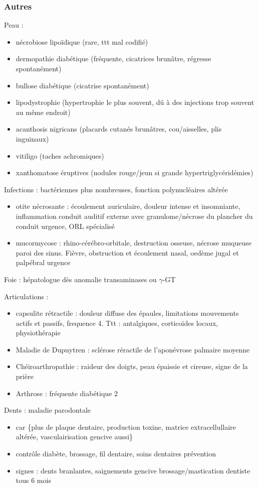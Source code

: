 \documentclass[11pt]{article}
\begin{document}
\subsubsection{Autres}
\label{sec:org185ba84}
Peau : 
\begin{itemize}
\item nécrobiose lipoïdique (rare, ttt mal codifié)
\item dermopathie diabétique (fréquente, cicatrices brunâtre, régresse spontanément)
\item bullose diabétique (cicatrise spontanément)
\item lipodystrophie (hypertrophie le plus souvent, dû à des injections trop souvent
au même endroit)
\item acanthosis nigricans (placards cutanés brunâtres, cou/aisselles, plis inguinaux)
\item vitiligo (taches achromiques)
\item xanthomatose éruptives (nodules rouge/jeun si grande hypertriglycéridémies)
\end{itemize}
Infections : bactériennes plus nombreuses, fonction polynucléaires altérée
\begin{itemize}
\item otite nécrosante : écoulement auriculaire, douleur intense et insomniante,
inflammation conduit auditif externe avec granulome/nécrose du plancher du
conduit \thus \danger urgence, ORL spécialisé
\item mucormycose : rhino-cérébro-orbitale, destruction osseuse, nécrose muqueuse
paroi des sinus. Fièvre, obstruction et écoulement nasal, oedème jugal et
palpébral \thus urgence \skull
\end{itemize}
Foie : hépatologue dès anomalie transaminases ou \(\gamma\)-GT

Articulations : 
\begin{itemize}
\item capsulite rétractile : douleur diffuse des épaules, limitations
mouvements actifs et passifs, frequence \texttimes{}4. Ttt : antalgiques, corticoïdes locaux,
physiothérapie
\item Maladie de Dupuytren : sclérose réractile de l'aponévrose palmaire moyenne
\item Chéiroarthropathie : raideur des doigts, peau épaissie et cireuse, signe de la
prière
\item Arthrose : fréquente diabétique 2
\end{itemize}

Dents : maladie parodontale 
\begin{itemize}
\item car \{plus de plaque dentaire, \inc production
toxine, matrice extracellullaire altérée, vasculairisation gencive aussi\}
\item contrôle diabète, brossage, fil dentaire, soins dentaires prévention
\item signes : dents branlantes, saignements gencive brossage/mastication
\thus dentiste tous 6 mois
\end{itemize}
\end{document}
